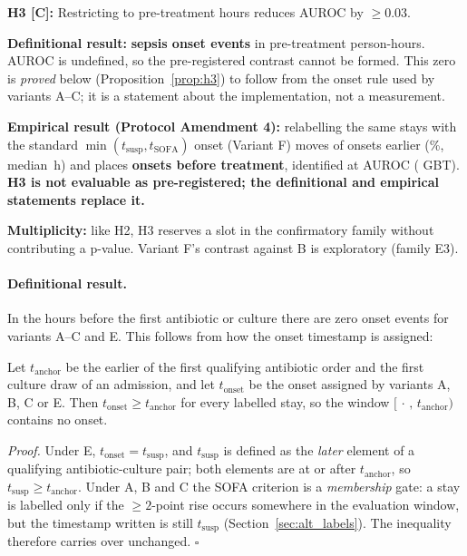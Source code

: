 \begin{mdframed}[backgroundcolor=ATUPurple!10, linecolor=ATUPurple]
    \textbf{H3 [C]:} Restricting to pre-treatment hours reduces AUROC by
    $\geq 0.03$.

    \textbf{Definitional result:} \textbf{\pcPreTreatOnsetsVarB{} sepsis onset
    events} in \pcPreTreatPersonHoursVarB{} pre-treatment person-hours. AUROC is
    undefined, so the pre-registered contrast cannot be formed. This zero is
    \emph{proved} below (Proposition~\ref{prop:h3}) to follow from the onset
    rule used by variants A--C; it is a statement about the implementation, not
    a measurement.

    \textbf{Empirical result (Protocol Amendment 4):} relabelling the same
    stays with the standard $\min(t_{\text{susp}}, t_{\text{SOFA}})$ onset
    (Variant F) moves \pcFNMovedEarlier{} of \pcFNOnsets{} onsets earlier
    (\pcFPctMovedEarlier\%, median \pcFMedianShiftH\,h) and places
    \textbf{\pcPreTreatOnsetsVarF{} onsets before treatment}, identified at
    \pcPreTreatAurocPrimaryF{} AUROC (\pcPreTreatAurocGbtF{} GBT).
    \textbf{H3 is not evaluable as pre-registered; the definitional and
    empirical statements replace it.}

    \textbf{Multiplicity:} like H2, H3 reserves a slot in the confirmatory
    family without contributing a p-value. Variant F's contrast against B is
    exploratory (family E3).
\end{mdframed}

\paragraph{Definitional result.}
In the hours before the first antibiotic or culture there are zero onset events
for variants A--C and E. This follows from how the onset timestamp is assigned:

\begin{mdframed}[backgroundcolor=ATUSand!20, linecolor=ATUGreen]
    \begin{proposition}\label{prop:h3}
    Let $t_{\mathrm{anchor}}$ be the earlier of the first qualifying antibiotic
    order and the first culture draw of an admission, and let
    $t_{\mathrm{onset}}$ be the onset assigned by variants A, B, C or E. Then
    $t_{\mathrm{onset}} \geq t_{\mathrm{anchor}}$ for every labelled stay, so the
    window $[\,\cdot\,,\, t_{\mathrm{anchor}})$ contains no onset.
    \end{proposition}

    \emph{Proof.} Under E, $t_{\mathrm{onset}} = t_{\mathrm{susp}}$, and
    $t_{\mathrm{susp}}$ is defined as the \emph{later} element of a qualifying
    antibiotic-culture pair; both elements are at or after
    $t_{\mathrm{anchor}}$, so $t_{\mathrm{susp}} \geq t_{\mathrm{anchor}}$.
    Under A, B and C the SOFA criterion is a \emph{membership} gate: a stay is
    labelled only if the $\geq 2$-point rise occurs somewhere in the evaluation
    window, but the timestamp written is still $t_{\mathrm{susp}}$
    (Section~\ref{sec:alt_labels}). The inequality therefore carries over
    unchanged. $\square$
\end{mdframed}

